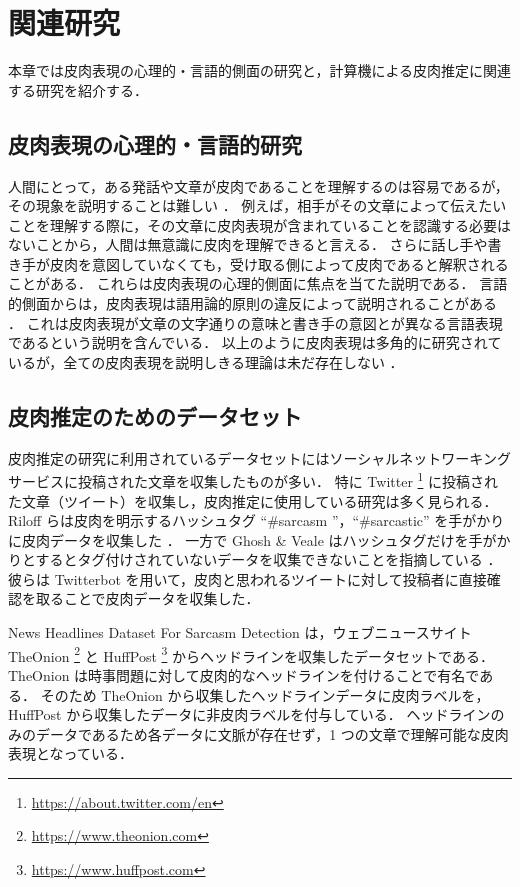 \newpage
\changeindent{0cm}
\section{関連研究}
\changeindent{2cm}



本章では皮肉表現の心理的・言語的側面の研究と，計算機による皮肉推定に関連する研究を紹介する．
\par

\subsection{皮肉表現の心理的・言語的研究}

人間にとって，ある発話や文章が皮肉であることを理解するのは容易であるが，その現象を説明することは難しい \cite{GIBBS1991523}．
例えば，相手がその文章によって伝えたいことを理解する際に，その文章に皮肉表現が含まれていることを認識する必要はないことから，人間は無意識に皮肉を理解できると言える．
さらに話し手や書き手が皮肉を意図していなくても，受け取る側によって皮肉であると解釈されることがある．
これらは皮肉表現の心理的側面に焦点を当てた説明である．
言語的側面からは，皮肉表現は語用論的原則の違反によって説明されることがある \cite{HAVERKATE199077}．
これは皮肉表現が文章の文字通りの意味と書き手の意図とが異なる言語表現であるという説明を含んでいる．
以上のように皮肉表現は多角的に研究されているが，全ての皮肉表現を説明しきる理論は未だ存在しない \cite{Ozerova}．


\subsection{皮肉推定のためのデータセット}

皮肉推定の研究に利用されているデータセットにはソーシャルネットワーキングサービスに投稿された文章を収集したものが多い．
特に Twitter \footnote{\url{https://about.twitter.com/en}} に投稿された文章（ツイート）を収集し，皮肉推定に使用している研究は多く見られる．
Riloff らは皮肉を明示するハッシュタグ “\#sarcasm ”，“\#sarcastic” を手がかりに皮肉データを収集した \cite{DBLP:conf/emnlp/RiloffQSSGH13}．
一方で Ghosh \& Veale はハッシュタグだけを手がかりとするとタグ付けされていないデータを収集できないことを指摘している \cite{ghosh-veale-2017-magnets}．彼らは Twitterbot を用いて，皮肉と思われるツイートに対して投稿者に直接確認を取ることで皮肉データを収集した．
\par
News Headlines Dataset For Sarcasm Detection \cite{misra2019sarcasm} は，ウェブニュースサイト TheOnion \footnote{\url{https://www.theonion.com}} と HuffPost \footnote{\url{https://www.huffpost.com}} からヘッドラインを収集したデータセットである．
TheOnion は時事問題に対して皮肉的なヘッドラインを付けることで有名である．
そのため TheOnion から収集したヘッドラインデータに皮肉ラベルを，HuffPost から収集したデータに非皮肉ラベルを付与している．
ヘッドラインのみのデータであるため各データに文脈が存在せず，1 つの文章で理解可能な皮肉表現となっている．



